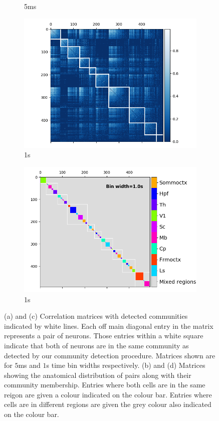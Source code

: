 \begin{figure}
\begin{subfigure}[h]{0.5\linewidth}
      \caption{5ms}
      \label{fig:regional_cluster_map_5ms}
    \end{subfigure}
    \begin{subfigure}[h]{0.5\linewidth}
      \includegraphics[width=\linewidth]{figures/eight_probe/Krebs_1p0_rectified_cons_cluster_map.png}
      \caption{1s}
      \label{fig:consensus_cluster_1s}
    \end{subfigure}
    \begin{subfigure}[h]{0.5\linewidth}
      \includegraphics[width=\linewidth]{figures/eight_probe/Krebs_1p0_regional_cluster_map.png}
      \caption{1s}
      \label{fig:regional_cluster_map_1s}
    \end{subfigure}
    \caption{(a) and (c) Correlation matrices with detected communities indicated by white lines. Each off main diagonal entry in the matrix represents a pair of neurons. Those entries within a white square indicate that both of neurons are in the same community as detected by our community detection procedure. Matrices shown are for $5$ms and $1$s time bin widths respectively. (b) and (d) Matrices showing the anatomical distribution of pairs along with their community membership. Entries where both cells are in the same reigon are given a colour indicated on the colour bar. Entries where cells are in different regions are given the grey colour also indicated on the colour bar.}

\end{figure}
